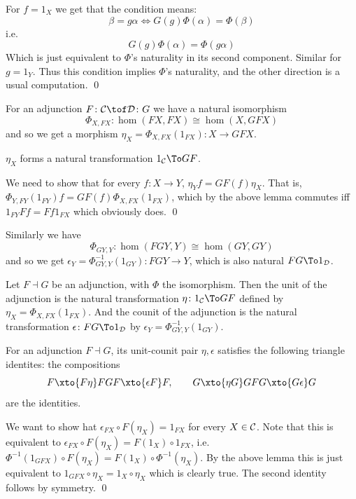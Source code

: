 \bproof

    For $f=1_X$ we get that the condition means:
    $$ \beta = g\alpha \iff G(g)\Phi(\alpha) = \Phi(\beta) $$
    i.e.\
    $$ G(g)\Phi(\alpha) = \Phi(g\alpha) $$
    Which is just equivalent to $\Phi$'s naturality in its second component.
    Similar for $g=1_Y$.
    Thus this condition implies $\Phi$'s naturality, and the other direction is a usual computation.
    \qed

\eproof

For an adjunction $F\colon\C\tof\D\colon G$ we have a natural isomorphism
$$ \Phi_{X,FX}\colon \hom(FX,FX) \cong \hom(X,GFX) $$
and so we get a morphism $\eta_X=\Phi_{X,FX}(1_{FX})\colon X\to GFX$.

\blemm

    $\eta_X$ forms a natural transformation $1_\C\To GF$.

\elemm

\bproof

    We need to show that for every $f\colon X\to Y$, $\eta_Yf=GF(f)\eta_X$.
    That is, $\Phi_{Y,FY}(1_{FY})f=GF(f)\Phi_{X,FX}(1_{FX})$, which by the above lemma commutes iff $1_{FY}Ff=Ff1_{FX}$ which obviously does.
    \qed

\eproof

Similarly we have
$$ \Phi_{GY,Y}\colon\hom(FGY,Y) \cong \hom(GY,GY) $$
and so we get $\epsilon_Y=\Phi_{GY,Y}^{-1}(1_{GY})\colon FGY\to Y$, which is also natural $FG\To1_\D$.

\bdefn

    Let $F\dashv G$ be an adjunction, with $\Phi$ the isomorphism.
    Then the {\emphcolor unit} of the adjunction is the natural transformation $\eta\colon1_\C\To GF$ defined by $\eta_X=\Phi_{X,FX}(1_{FX})$.
    And the {\emphcolor counit} of the adjunction is the natural transformation $\epsilon\colon FG\To1_\D$ by $\epsilon_Y=\Phi^{-1}_{GY,Y}(1_{GY})$.

\edefn

\blemm[title=The triangle identities]

    For an adjunction $F\dashv G$, its unit-counit pair $\eta,\epsilon$ satisfies the following {\emphcolor triangle identites}: the compositions
    $$ F\xto{F\eta}FGF\xto{\epsilon F}F,\qquad G\xto{\eta G}GFG\xto{G\epsilon}G $$
    are the identities.

\elemm

\bproof

    We want to show hat $\epsilon_{FX}\circ F(\eta_X)=1_{FX}$ for every $X\in{{\cal C}}$.
    Note that this is equivalent to $\epsilon_{FX}\circ F(\eta_X)=F(1_X)\circ 1_{FX}$, i.e.\ $\Phi^{-1}(1_{GFX})\circ F(\eta_X)=F(1_X)\circ\Phi^{-1}(\eta_X)$.
    By the above lemma this is just equivalent to $1_{GFX}\circ\eta_X=1_X\circ\eta_X$ which is clearly true.
    The second identity follows by symmetry.
    \qed

